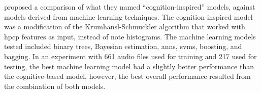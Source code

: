 
\textcite{gomez2004estimating} proposed a comparison of what
they named ``cognition-inspired'' models, against models
derived from machine learning techniques. The
cognition-inspired model was a modification of the
Krumhansl-Schmuckler algorithm that worked with
\acrfull{hpcp} features as input, instead of note
histograms. The machine learning models tested included
binary trees, Bayesian estimation, \glspl{ann}, \glspl{svm},
boosting, and bagging. In an experiment with 661 audio files
used for training and 217 used for testing, the best machine
learning model had a slightly better performance than the
cognitive-based model, however, the best overall performance
resulted from the combination of both models.


